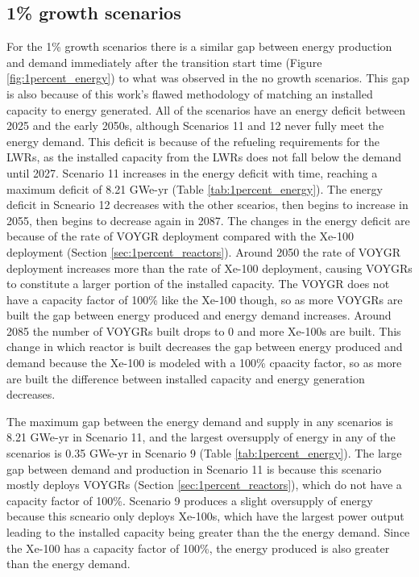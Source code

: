 \subsection{1\% growth scenarios}
For the 1\% growth scenarios there is a similar gap between energy 
production and 
demand immediately after the transition start time (Figure 
\ref{fig:1percent_energy}) to what was observed in the no growth 
scenarios. This gap is also because of this work's flawed methodology of 
matching an installed capacity to energy generated. All of the scenarios 
have an energy deficit 
between 2025 and the early 2050s, although Scenarios 11 and 12 never fully 
meet the energy demand. This deficit is because of the refueling 
requirements for the \glspl{LWR}, as the installed capacity from the 
\glspl{LWR} does not fall below the demand until 2027. Scenario 11
increases in the energy deficit with time, reaching a maximum deficit 
of 8.21 GWe-yr (Table \ref{tab:1percent_energy}). The energy deficit in 
Scneario 12 decreases with the other scearios, then begins to increase 
in 2055, then begins to decrease again in 2087. The changes in the 
energy deficit are because of the rate of VOYGR deployment compared with 
the Xe-100 deployment (Section \ref{sec:1percent_reactors}). Around 2050
the rate of VOYGR deployment increases more than the rate of Xe-100 
deployment, causing VOYGRs to constitute a larger portion of the installed 
capacity. The VOYGR does not have a capacity factor of 100\% like the Xe-100 
though, so as more VOYGRs are built the gap between energy produced and 
energy demand increases. Around 2085 the number of VOYGRs built drops to 
0 and more Xe-100s are built. This change in which reactor is built decreases
the gap between energy produced and demand because the Xe-100 is modeled with 
a 100\% cpaacity factor, so as more are built the difference between installed 
capacity and energy generation decreases. 

The maximum gap between 
the energy demand and supply in any scenarios is 8.21 GWe-yr in Scenario 11, 
and the largest oversupply of energy in any of the scenarios is 
0.35 GWe-yr in Scenario 9 (Table \ref{tab:1percent_energy}). The large gap 
between demand and production in Scenario 11 is because this scenario mostly 
deploys VOYGRs (Section \ref{sec:1percent_reactors}), which do not 
have a capacity factor of 100\%. Scenario 9 produces a slight oversupply 
of energy because this scneario only deploys Xe-100s, which have the largest 
power output leading to the installed capacity being greater than the the 
energy demand. Since the Xe-100 has a capacity factor of 100\%, the energy 
produced is also greater than the energy demand. 

